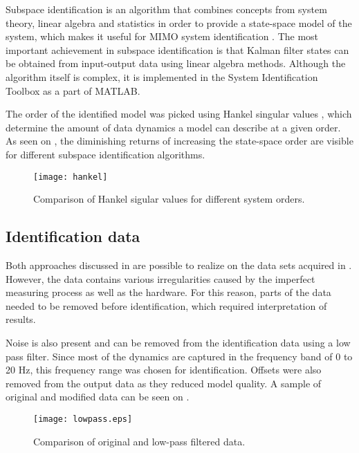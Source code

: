Subspace identification is an algorithm that combines concepts from system theory, linear algebra and statistics in order to provide a state-space model of the system, which makes it useful for MIMO system identification \cite{van2012subspace}. 
The most important achievement in subspace identification is that Kalman filter states can be obtained from input-output data using linear algebra methods.
Although the algorithm itself is complex, it is implemented in the System Identification Toolbox as a part of MATLAB.

The order of the identified model was picked using Hankel singular values \cite{gawronski1990model}, which determine the amount of data dynamics a model can describe at a given order.
As seen on , the diminishing returns of increasing the state-space order are visible for different subspace identification algorithms.

\begin{figure}[H]
\centering
\texttt{[image: hankel]}
\caption{Comparison of Hankel sigular values for different system orders.}
\label{hankel}
\end{figure}

\subsection{Identification data}

Both approaches discussed in  are possible to realize on the data sets acquired in .
However, the data contains various irregularities caused by the imperfect measuring process as well as the hardware. 
For this reason, parts of the data needed to be removed before identification, which required interpretation of results.

Noise is also present and can be removed from the identification data using a low pass filter.
Since most of the dynamics are captured in the frequency band of 0 to 20 Hz, this frequency range was chosen for identification.
Offsets were also removed from the output data as they reduced model quality.
A sample of original and modified data can be seen on .

\begin{figure}[H]
\centering
\texttt{[image: lowpass.eps]}
\caption{Comparison of original and low-pass filtered data.}
\label{figlowpass}
\end{figure}

